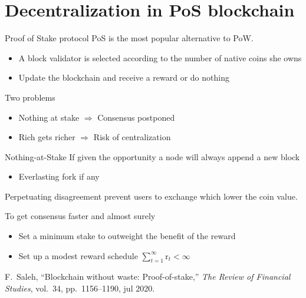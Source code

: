 \documentclass{beamer}
\newcommand*{\warning}{\fontencoding{U}\fontfamily{futs}\selectfont\char 66\relax}
\begin{document}
\section{Decentralization in PoS blockchain}
\begin{frame}{Proof of Stake protocol}
\scriptsize
PoS is the most popular alternative to PoW.
\begin{itemize}
  \item A block validator is selected according to the number of native coins she owns
  \item Update the blockchain and receive a reward or do nothing  
\end{itemize}
Two problems 
\begin{itemize}
  \item[\warning] Nothing at stake $\Rightarrow$ Consensus postponed
  \item[\warning] Rich gets richer $\Rightarrow$ Risk of centralization
\end{itemize}

\end{frame}
\begin{frame}{Nothing-at-Stake}
\scriptsize
If given the opportunity a node will always append a new block
\begin{itemize}
  \item Everlasting fork if any
\end{itemize}
Perpetuating disagreement prevent users to exchange which lower the coin value.
\begin{tcolorbox}[enhanced,drop shadow, title=Theorem]
To get consensus faster and almost surely 
\begin{itemize}
  \item Set a minimum stake to outweight the benefit of the reward
  \item Set up a modest reward schedule $\sum_{t = 1}^\infty \text{r}_t<\infty$
\end{itemize}
\end{tcolorbox}
\tiny
\begin{thebibliography}{1}

F.~Saleh, ``Blockchain without waste: Proof-of-stake,'' {\em The Review of
  Financial Studies}, vol.~34, pp.~1156--1190, jul 2020.
\end{thebibliography}
\end{frame}
\end{document}
